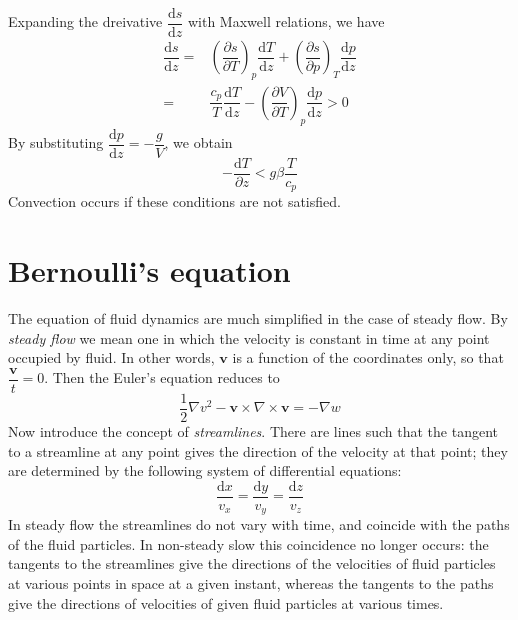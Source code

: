\documentclass[conference]{IEEEtran}
\theoremstyle{definition}
\theoremstyle{remark}
\begin{document}
    Expanding the dreivative $\dfrac{\mathrm{d} s}{\mathrm{d} z}$ with Maxwell relations, we have
    \begin{align}
        \dfrac{\mathrm{d} s}{\mathrm{d} z} =& \left( \dfrac{\partial s}{\partial T} \right)_p \dfrac{\mathrm{d} T}{\mathrm{d} z} + \left( \dfrac{\partial s}{\partial p} \right)_T \dfrac{\mathrm{d} p}{\mathrm{d} z} \nonumber \\
        =& \dfrac{c_p}{T} \dfrac{\mathrm{d} T}{\mathrm{d} z} - \left( \dfrac{\partial V}{\partial T} \right)_p \dfrac{\mathrm{d} p}{\mathrm{d} z} > 0
    \end{align}
    By substituting $\dfrac{\mathrm{d} p}{\mathrm{d} z} = -\dfrac{g}{V}$, we obtain
    \begin{equation}
        -\dfrac{\mathrm{d} T}{\partial z} < g\beta \dfrac{T}{c_p}
    \end{equation}
    Convection occurs if these conditions are not satisfied.

    \section{Bernoulli's equation}
    The equation of fluid dynamics are much simplified in the case of steady flow. By \emph{steady flow} we mean one in which the velocity is constant in time at any point occupied by fluid. In other words, $\mathbf{v}$ is a function of the coordinates only, so that $\dfrac{\mathbf{v}}{t} = 0$. Then the Euler's equation reduces to 
    \begin{equation}
        \dfrac12 \nabla v^2 - \mathbf{v} \times \nabla \times \mathbf{v} = -\nabla w
        \label{eq:steady_state_flow}
    \end{equation}
    Now introduce the concept of \emph{streamlines}. There are lines such that the tangent to a streamline at any point gives the direction of the velocity at that point; they are determined by the following system of differential equations:
    \begin{equation}
        \dfrac{\mathrm{d} x}{v_x} = \dfrac{\mathrm{d} y}{v_y} = \dfrac{\mathrm{d} z}{v_z}
    \end{equation}
    In steady flow the streamlines do not vary with time, and coincide with the paths of the fluid particles. In non-steady slow this coincidence no longer occurs: the tangents to the streamlines give the directions of the velocities of fluid particles at various points in space at a given instant, whereas the tangents to the paths give the directions of velocities of given fluid particles at various times.
\end{document}
